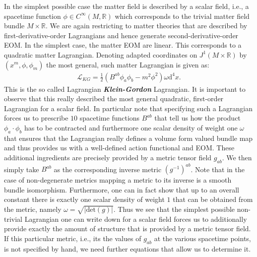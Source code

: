 In the simplest possible case the matter field is described by a scalar field, i.e., a spacetime function $\phi \in C^{\infty}(M,\mathbb{R})$ which corresponds to the trivial matter field bundle $M \times \mathbb{R}$. We are again restricting to matter theories that are described by first-derivative-order Lagrangians and hence generate second-derivative-order EOM. In the simplest case, the matter EOM are linear. This corresponds to a quadratic matter Lagrangian. Denoting adapted coordinates on $J^1(M \times \mathbb{R})$ by $(x^m,\phi,\phi_m)$ the most general, such matter Lagrangian is given as:
\begin{align}\label{KGL}
    \mathcal{L}_{KG} = \frac{1}{2} \left ( B^{ab} \phi_a \phi_b - m^2 \phi^2\right )\omega \mathrm{d}^4x.
\end{align}
This is the so called Lagrangian \textit{\textbf{Klein-Gordon}} Lagrangian. It is important to observe that this really described the most general quadratic, first-order Lagrangian for a scalar field. 
In particular note that specifying such a Lagrangian forces us to prescribe $10$ spacetime functions $B^{ab}$ that tell us how the product $\phi_a\cdot \phi_b$ has to be contracted and furthermore one scalar density of weight one $\omega$ that ensures that the Lagrangian really defines a volume form valued bundle map and thus provides us with a well-defined action functional and EOM.
These additional ingredients are precisely provided by a metric tensor field $g_{ab}$. We then simply take $B^{ab}$ as the corresponding inverse metric $(g^{-1})^{ab}$. Note that in the case of non-degenerate metrics mapping a metric to its inverse is a smooth bundle isomorphism. Furthermore, one can in fact show that up to an overall constant there is exactly one scalar density of weight $1$ that can be obtained from the metric, namely $\omega = \sqrt{ \vert \mathrm{det}(g) \vert }$. 
Thus we see that the simplest possible non-trivial Lagrangian one can write down for a scalar field forces us to additionally provide exactly the amount of structure that is provided by a metric tensor field. If this particular metric, i.e., its the values of $g_{ab}$ at the various spacetime points, is not specified by hand, we need further equations that allow us to determine it.  

